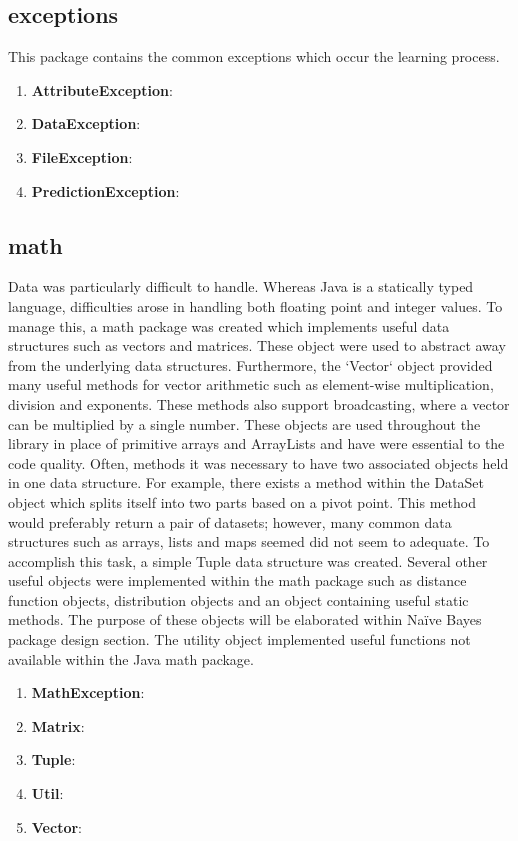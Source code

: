 \documentclass[11pt]{article}
\newcommand{\bb}{\textbf}
\begin{document}
\subsection{exceptions}
This package contains the common exceptions which occur the learning process.

\begin{enumerate}[leftmargin=*]
  \item[] \bb{AttributeException}:
  \item[] \bb{DataException}:
  \item[] \bb{FileException}:
  \item[] \bb{PredictionException}:
\end{enumerate}

\subsection{math}
Data was particularly difficult to handle. Whereas Java is a statically typed language, difficulties arose in handling both floating point and integer values. To manage this, a math package was created which implements useful data structures such as vectors and matrices. These object were used to abstract away from the underlying data structures. Furthermore, the `Vector` object provided many useful methods for vector arithmetic such as element-wise multiplication, division and exponents. These methods also support broadcasting, where a vector can be multiplied by a single number. These objects are used throughout the library in place of primitive arrays and ArrayLists and have were essential to the code quality. Often, methods it was necessary to have two associated objects held in one data structure. For example, there exists a method within the DataSet object which splits itself into two parts based on a pivot point. This method would preferably return a pair of datasets; however, many common data structures such as arrays, lists and maps seemed did not seem to adequate. To accomplish this task, a simple Tuple data structure was created. Several other useful objects were implemented within the math package such as distance function objects, distribution objects and an object containing useful static methods. The purpose of these objects will be elaborated within Naïve Bayes package design section. The utility object implemented useful functions not available within the Java math package.

\begin{enumerate}[leftmargin=*]
  \item[] \bb{MathException}:
  \item[] \bb{Matrix}:
  \item[] \bb{Tuple}:
  \item[] \bb{Util}:
  \item[] \bb{Vector}:
\end{enumerate}
\end{document}
